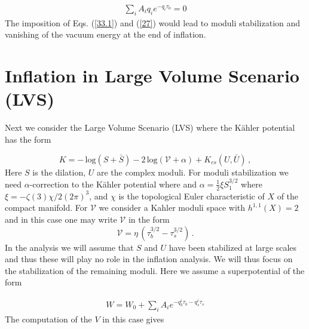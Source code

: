 \documentclass[12pt]{article}
\begin{document}
\begin{align}
  \sum_i A_i q_i e^{-q_i \tau_0}=0
  \label{27}
\end{align}
The imposition of Eqs. (\ref{33.1}) and (\ref{27}) would lead to moduli stabilization and
vanishing of the vacuum energy at the end of inflation. \\


\section{Inflation in Large Volume Scenario (LVS) \label{sec:LVS}}

Next we consider the Large Volume Scenario (LVS) \cite{Balasubramanian:2005zx}
where the K\"ahler potential has the form

\begin{equation}
  K = - \, \text{log} (S+ \bar{S}) -2 \, \text{log} (\mathcal{V} +\alpha)
  + K_{cs} (U, \bar{U})  \, ,
\end{equation}
Here $S$ is the dilation, $U$ are the complex moduli. For moduli stabilization we need $\alpha$-correction to the K\"ahler potential where
and $\alpha = \frac{1}{2} \xi S_1^{3/2}$ where $\xi = -\zeta (3) \chi/2 (2\pi)^3$, and $\chi$ is the topological Euler characteristic of $X$ of the compact manifold. For $\mathcal{V}$ we consider a Kahler moduli space
with $h^{1,1}(X)=2$ and in this case one may write $\mathcal{V}$ in the form
\begin{equation}
  \mathcal{V} = \eta \,( \tau_b^{3/2} - \tau_s^{3/2}) \, .
\end{equation}
In the analysis we will assume that $S$ and $U$ have been stabilized at large scales and thus these will play no role in the
inflation analysis. We will thus focus on the stabilization of the remaining moduli. Here we assume a superpotential of the form

\begin{align}
  W= W_0 +\sum_i A_i e^{-q^i_b \tau_b -q^i_s \tau_s}
\end{align}
The computation of the $V$ in this case gives
\end{document}
